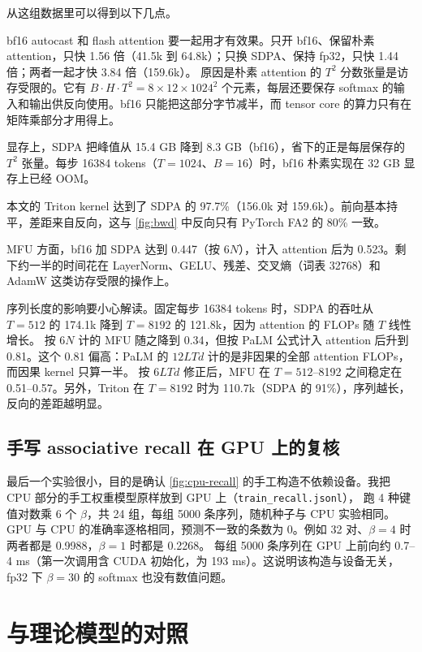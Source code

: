 \documentclass[11pt,a4paper]{ctexart}
\begin{document}
从这组数据里可以得到以下几点。

bf16 autocast 和 flash attention 要一起用才有效果。只开 bf16、保留朴素 attention，只快 1.56 倍（41.5k 到 64.8k）；只换 SDPA、保持 fp32，只快 1.44 倍；两者一起才快 3.84 倍（159.6k）。
原因是朴素 attention 的 $T^2$ 分数张量是访存受限的。它有 $B\cdot H\cdot T^2=8\times12\times1024^2$ 个元素，每层还要保存 softmax 的输入和输出供反向使用。bf16 只能把这部分字节减半，而 tensor core 的算力只有在矩阵乘部分才用得上。

显存上，SDPA 把峰值从 15.4 GB 降到 8.3 GB（bf16），省下的正是每层保存的 $T^2$ 张量。每步 16384 tokens（$T=1024$、$B=16$）时，bf16 朴素实现在 32 GB 显存上已经 OOM。

本文的 Triton kernel 达到了 SDPA 的 97.7\%（156.0k 对 159.6k）。前向基本持平，差距来自反向，这与 \cref{fig:bwd} 中反向只有 PyTorch FA2 的 80\% 一致。

MFU 方面，bf16 加 SDPA 达到 0.447（按 $6N$），计入 attention 后为 0.523。剩下约一半的时间花在 LayerNorm、GELU、残差、交叉熵（词表 32768）和 AdamW 这类访存受限的操作上。

序列长度的影响要小心解读。固定每步 16384 tokens 时，SDPA 的吞吐从 $T=512$ 的 174.1k 降到 $T=8192$ 的 121.8k，因为 attention 的 FLOPs 随 $T$ 线性增长。
按 $6N$ 计的 MFU 随之降到 0.34，但按 PaLM 公式计入 attention 后升到 0.81。这个 0.81 偏高：PaLM 的 $12LTd$ 计的是非因果的全部 attention FLOPs，而因果 kernel 只算一半。
按 $6LTd$ 修正后，MFU 在 $T=512$–8192 之间稳定在 0.51–0.57。另外，Triton 在 $T=8192$ 时为 110.7k（SDPA 的 91\%），序列越长，反向的差距越明显。

\subsection{手写 associative recall 在 GPU 上的复核}\label{sec:recallgpu}

最后一个实验很小，目的是确认 \cref{fig:cpu-recall} 的手工构造不依赖设备。我把 CPU 部分的手工权重模型原样放到 GPU 上（\texttt{train\_recall.jsonl}），
跑 4 种键值对数乘 6 个 $\beta$，共 24 组，每组 5000 条序列，随机种子与 CPU 实验相同。
GPU 与 CPU 的准确率逐格相同，预测不一致的条数为 0。例如 32 对、$\beta=4$ 时两者都是 0.9988，$\beta=1$ 时都是 0.2268。
每组 5000 条序列在 GPU 上前向约 0.7–4 ms（第一次调用含 CUDA 初始化，为 193 ms）。这说明该构造与设备无关，fp32 下 $\beta=30$ 的 softmax 也没有数值问题。

\section{与理论模型的对照}\label{sec:theory}
\end{document}
